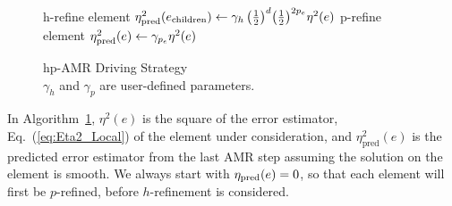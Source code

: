 \begin{figure}[ht!]
  \begin{algorithm}[H]
    \caption{\label{alg:hpamr}
      hp-AMR Driving Strategy\\
      $\gamma_{h}$ and $\gamma_{p}$ are user-defined parameters.
    }
    \begin{algorithmic}[1]
           \State h-refine element
          \State $\eta^2_{\rm pred}(e_{\textrm{children}}) \gets \gamma_{h}\,\big(\frac{1}{2}\big)^{d}\big(\frac{1}{2}\big)^{2p_e}\eta^{2}(e)$
          \Else
                     \State p-refine element
          \State $\eta^2_{\rm pred}(e) \gets \gamma_{p_e}\eta^2(e)$
          \EndIf
        \EndIf
      \EndProcedure
    \end{algorithmic}
  \end{algorithm}
\end{figure}

In Algorithm~\ref{alg:hpamr}, $\eta^2(e)$ is the square of the error
estimator, Eq.~(\ref{eq:Eta2_Local}) of the element under
  consideration, and $\eta_{\text{pred}}^2(e)$ is the predicted error
  estimator from the last AMR step assuming the solution on the
  element is smooth. We always start with $\eta_{\rm pred}(e)=0$, so that
  each element will first be $p$-refined, before $h$-refinement is
  considered.

